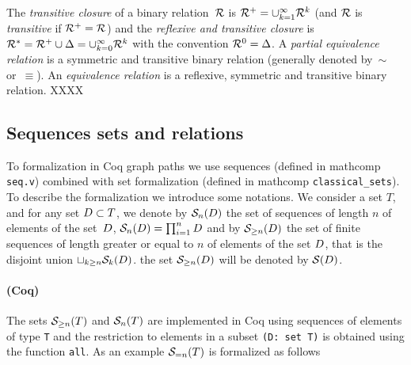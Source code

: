 \documentclass[12pt]{article}
\begin{document}
The \emph{transitive closure} of a binary relation~$\mathcal{R}$ is
\( \mathcal{R}^{+} = \cup_{k=1}^{\infty} \mathcal{R}^{k} \)
(and $\mathcal{R}$ is  \emph{transitive} if \( \mathcal{R}^{+}=\mathcal{R} \))
and the \emph{reflexive and transitive closure} is 
\( \mathcal{R}^{*}= \mathcal{R}^{+} \cup
\Delta = \cup_{k=0}^{\infty} \mathcal{R}^{k} \) with the convention $\mathcal{R}^0=\Delta$. 
% 
A \emph{partial equivalence relation} is a symmetric and transitive binary
relation (generally denoted by~$\sim$ or~$\equiv$).
An \emph{equivalence relation} is a reflexive, symmetric and transitive binary
relation. XXXX \cite{Gonthier-Mahboubi-Tassi:2016} \cite{MathComp:2022}

\subsection{Sequences sets and relations}
\label{sec:sequences}
\newcommand{\fullset}{T}

To formalization in Coq graph paths we use sequences (defined in mathcomp
\texttt{seq.v}) combined with set formalization (defined in mathcomp
\texttt{classical\_sets}). To describe the formalization we introduce some
notations. We consider a set $\fullset$, and for any set ${\Set} \subset \fullset$, we denote by
${\cal S}_n(D)$ the set of sequences of length $n$ of elements of the
set~$D$, ${\cal S}_n(D)= \prod_{i=1}^{n} D$ and by
${\cal S}_{\ge n}(D)$ the set of finite sequences of length greater or equal
to $n$ of elements of the set $D$, that is the disjoint union
$\sqcup_{k\ge n} {\cal S}_k(D)$. the set ${\cal S}_{\ge n}(D)$ will be denoted by ${\cal S}(D)$.

\paragraph{(Coq)} The sets $\Sequence_{\ge n}(\fullset)$ and $\Sequence_{n}(\fullset)$
are implemented in Coq using sequences of elements of type \texttt{T} 
and the restriction to elements in a subset \texttt{(D: set T)} is obtained using the function \texttt{all}. 
As an example ${\cal S}_{= n}(T)$ is formalized as follows
{\small {}}
\end{document}
